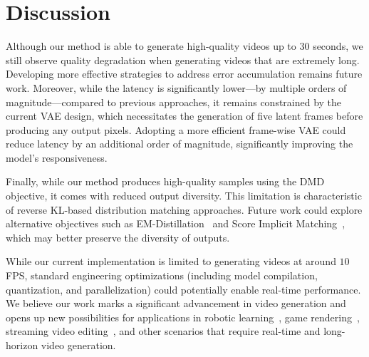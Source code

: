 



\section{Discussion}
\label{sec:discussion}
Although our method is able to generate high-quality videos up to 30 seconds, we still observe quality degradation when generating videos that are extremely long.
Developing more effective strategies to address error accumulation remains future work.
Moreover, while the latency is significantly lower—by multiple orders of magnitude—compared to previous approaches, it remains constrained by the current VAE design, which necessitates the generation of five latent frames before producing any output pixels. Adopting a more efficient frame-wise VAE could reduce latency by an additional order of magnitude, significantly improving the model's responsiveness.

Finally, while our method produces high-quality samples using the DMD objective, it comes with reduced output diversity. This limitation is characteristic of reverse KL-based distribution matching approaches. Future work could explore alternative objectives such as EM-Distillation~\cite{xie2024distillation} and Score Implicit Matching~\cite{luo2024one}, which may better preserve the diversity of outputs.

While our current implementation is limited to generating videos at around $10$ FPS, standard engineering optimizations (including model compilation, quantization, and parallelization) could potentially enable real-time performance.
We believe our work marks a significant advancement in video generation and opens up new possibilities for applications in robotic learning~\cite{escontrela2024video,wuunleashing}, game rendering~\cite{valevski2024diffusion,che2024gamegen}, streaming video editing~\cite{chen2024streaming}, and other scenarios that require real-time and long-horizon video generation.
